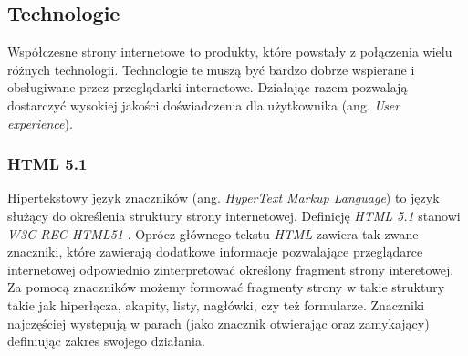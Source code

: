 \documentclass[polish, twoside, 12pt]{mwart}
\begin{document}
\subsection{Technologie}

Współczesne strony internetowe to produkty, które powstały z połączenia wielu różnych technologii. Technologie te muszą być bardzo dobrze wspierane i obsługiwane przez przeglądarki internetowe. Działając razem pozwalają dostarczyć wysokiej jakości doświadczenia dla użytkownika (ang. \emph{User experience}). 

\subsubsection{HTML 5.1} \label{html}

Hipertekstowy język znaczników (ang. \emph{HyperText Markup Language}) to język służący do określenia struktury strony internetowej. Definicję \emph{HTML 5.1} stanowi \emph{W3C REC-HTML51} \cite{w3c-rec-html51}. Oprócz głównego tekstu \emph{HTML} zawiera tak zwane znaczniki, które zawierają dodatkowe informacje pozwalające przeglądarce internetowej odpowiednio zinterpretować określony fragment strony interetowej. Za pomocą znaczników możemy formować fragmenty strony w takie struktury takie jak hiperłącza, akapity, listy, nagłówki, czy też formularze. Znaczniki najczęściej występują w parach (jako znacznik otwierając oraz zamykający) definiując zakres swojego działania.


\end{document}
